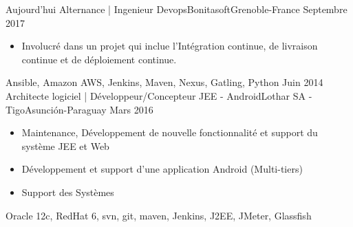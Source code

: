 %
%
%
\begin{experiences}
  \experience
    {Aujourd'hui}   {Alternance | Ingenieur Devops}{Bonitasoft}{Grenoble-France}
    {Septembre 2017} {
                      \begin{itemize}
                        \item Involucré dans un projet qui inclue l'Intégration continue, de livraison continue et de déploiement continue.
                      \end{itemize}
                    }
                    {Ansible, Amazon AWS, Jenkins, Maven, Nexus, Gatling, Python}
  \emptySeparator
  \experience
    {Juin 2014}   {Architecte logiciel | Développeur/Concepteur JEE - Android}{Lothar SA - Tigo}{Asunción-Paraguay}
    {Mars 2016} {
                      \begin{itemize}
                        \item Maintenance, Développement de nouvelle fonctionnalité et support du système JEE et Web
                        \item Développement et support d'une application Android (Multi-tiers)
                        \item Support des Systèmes
                      \end{itemize}
                      
				}{Oracle 12c, RedHat 6, svn, git, maven, Jenkins, J2EE, JMeter, Glassfish}                    
  \emptySeparator


\end{experiences}
